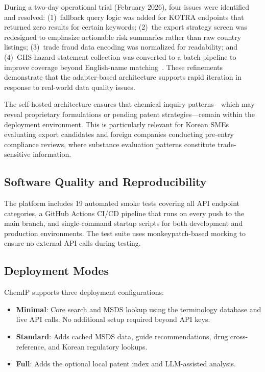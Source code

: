 \documentclass[preprint,12pt]{elsarticle}
\begin{document}
During a two-day operational trial (February 2026), four issues were identified and resolved: (1)~fallback query logic was added for KOTRA endpoints that returned zero results for certain keywords; (2)~the export strategy screen was redesigned to emphasize actionable risk summaries rather than raw country listings; (3)~trade fraud data encoding was normalized for readability; and (4)~GHS hazard statement collection was converted to a batch pipeline to improve coverage beyond English-name matching~\cite{api_adoption_playbook}.
These refinements demonstrate that the adapter-based architecture supports rapid iteration in response to real-world data quality issues.

The self-hosted architecture ensures that chemical inquiry patterns---which may reveal proprietary formulations or pending patent strategies---remain within the deployment environment.
This is particularly relevant for Korean SMEs evaluating export candidates and foreign companies conducting pre-entry compliance reviews, where substance evaluation patterns constitute trade-sensitive information.

\subsection{Software Quality and Reproducibility}

The platform includes 19 automated smoke tests covering all API endpoint categories, a GitHub Actions CI/CD pipeline that runs on every push to the main branch, and single-command startup scripts for both development and production environments.
The test suite uses monkeypatch-based mocking to ensure no external API calls during testing.

\subsection{Deployment Modes}

ChemIP supports three deployment configurations:
\begin{itemize}
  \item \textbf{Minimal}: Core search and MSDS lookup using the terminology database and live API calls. No additional setup required beyond API keys.
  \item \textbf{Standard}: Adds cached MSDS data, guide recommendations, drug cross-reference, and Korean regulatory lookups.
  \item \textbf{Full}: Adds the optional local patent index and LLM-assisted analysis.
\end{itemize}
\end{document}
